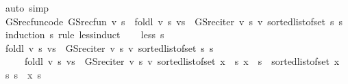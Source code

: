 \begin{isabellebody}
\ {\isacharparenleft}{\kern0pt}auto\ simp{\isacharcolon}{\kern0pt}\ {\isacharasterisk}{\kern0pt}{\isacharparenright}{\kern0pt}\isanewline
{}\isamarkupfalse%
%
\endisatagproof
{\isafoldproof}%
%
\isadelimproof
\isanewline
%
\endisadelimproof
\isanewline
{}\isamarkupfalse%
\ GS{\isacharunderscore}{\kern0pt}rec{\isacharunderscore}{\kern0pt}fun{\isacharunderscore}{\kern0pt}code{\isacharcolon}{\kern0pt}\ {\isachardoublequoteopen}GS{\isacharunderscore}{\kern0pt}rec{\isacharunderscore}{\kern0pt}fun\ v\ s\ {\isacharequal}{\kern0pt}\ foldl\ {\isacharparenleft}{\kern0pt}{\isasymlambda}v\ s{\isachardot}{\kern0pt}\ v{\isacharparenleft}{\kern0pt}s\ {\isacharcolon}{\kern0pt}{\isacharequal}{\kern0pt}\ GS{\isacharunderscore}{\kern0pt}rec{\isacharunderscore}{\kern0pt}iter\ v\ s{\isacharparenright}{\kern0pt}{\isacharparenright}{\kern0pt}\ v\ {\isacharparenleft}{\kern0pt}sorted{\isacharunderscore}{\kern0pt}list{\isacharunderscore}{\kern0pt}of{\isacharunderscore}{\kern0pt}set\ {\isacharbraceleft}{\kern0pt}{\isachardot}{\kern0pt}{\isachardot}{\kern0pt}s{\isacharbraceright}{\kern0pt}{\isacharparenright}{\kern0pt}\ s{\isachardoublequoteclose}\isanewline
%
\isadelimproof
%
\endisadelimproof
%
\isatagproof
{}\isamarkupfalse%
\ {\isacharparenleft}{\kern0pt}induction\ s\ rule{\isacharcolon}{\kern0pt}\ less{\isacharunderscore}{\kern0pt}induct{\isacharparenright}{\kern0pt}\isanewline
\ \ \isamarkupfalse%
\ {\isacharparenleft}{\kern0pt}less\ s{\isacharparenright}{\kern0pt}\isanewline
\ \ \isamarkupfalse%
\ {\isachardoublequoteopen}foldl\ {\isacharparenleft}{\kern0pt}{\isasymlambda}v\ s{\isachardot}{\kern0pt}\ v{\isacharparenleft}{\kern0pt}s\ {\isacharcolon}{\kern0pt}{\isacharequal}{\kern0pt}\ GS{\isacharunderscore}{\kern0pt}rec{\isacharunderscore}{\kern0pt}iter\ v\ s{\isacharparenright}{\kern0pt}{\isacharparenright}{\kern0pt}\ v\ {\isacharparenleft}{\kern0pt}sorted{\isacharunderscore}{\kern0pt}list{\isacharunderscore}{\kern0pt}of{\isacharunderscore}{\kern0pt}set\ {\isacharbraceleft}{\kern0pt}{\isachardot}{\kern0pt}{\isachardot}{\kern0pt}s{\isacharbraceright}{\kern0pt}{\isacharparenright}{\kern0pt}\ s\isanewline
\ \ \ \ {\isacharequal}{\kern0pt}\ foldl\ {\isacharparenleft}{\kern0pt}{\isasymlambda}v\ s{\isachardot}{\kern0pt}\ v{\isacharparenleft}{\kern0pt}s\ {\isacharcolon}{\kern0pt}{\isacharequal}{\kern0pt}\ GS{\isacharunderscore}{\kern0pt}rec{\isacharunderscore}{\kern0pt}iter\ v\ s{\isacharparenright}{\kern0pt}{\isacharparenright}{\kern0pt}\ v\ {\isacharparenleft}{\kern0pt}sorted{\isacharunderscore}{\kern0pt}list{\isacharunderscore}{\kern0pt}of{\isacharunderscore}{\kern0pt}set\ {\isacharbraceleft}{\kern0pt}x\ {\isasymin}\ {\isacharbraceleft}{\kern0pt}{\isachardot}{\kern0pt}{\isachardot}{\kern0pt}s{\isacharbraceright}{\kern0pt}{\isachardot}{\kern0pt}\ x\ {\isacharless}{\kern0pt}\ s{\isacharbraceright}{\kern0pt}\ {\isacharat}{\kern0pt}\ sorted{\isacharunderscore}{\kern0pt}list{\isacharunderscore}{\kern0pt}of{\isacharunderscore}{\kern0pt}set\ {\isacharbraceleft}{\kern0pt}x\ {\isasymin}\ {\isacharbraceleft}{\kern0pt}{\isachardot}{\kern0pt}{\isachardot}{\kern0pt}s{\isacharbraceright}{\kern0pt}{\isachardot}{\kern0pt}\ s\ {\isasymle}\ x{\isacharbraceright}{\kern0pt}{\isacharparenright}{\kern0pt}\ s{\isachardoublequoteclose}\isanewline

\end{isabellebody}
